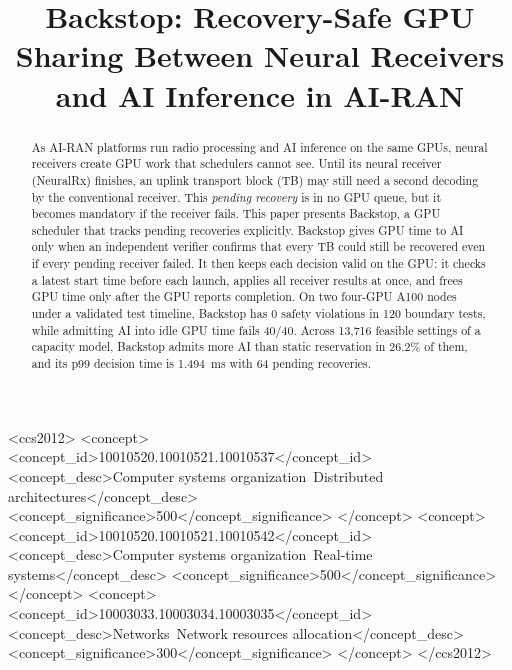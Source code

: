 \documentclass[acmsmall,screen,review,anonymous]{acmart}
\newcommand{\sys}{Backstop\xspace}
\newcommand{\NRx}{NeuralRx\xspace}
\begin{document}
\title[Backstop: Recovery-Safe GPU Sharing in AI-RAN]{Backstop: Recovery-Safe GPU Sharing Between
Neural Receivers and AI Inference in AI-RAN}


\begin{CCSXML}
<ccs2012>
 <concept>
  <concept_id>10010520.10010521.10010537</concept_id>
  <concept_desc>Computer systems organization~Distributed architectures</concept_desc>
  <concept_significance>500</concept_significance>
 </concept>
 <concept>
  <concept_id>10010520.10010521.10010542</concept_id>
  <concept_desc>Computer systems organization~Real-time systems</concept_desc>
  <concept_significance>500</concept_significance>
 </concept>
 <concept>
  <concept_id>10003033.10003034.10003035</concept_id>
  <concept_desc>Networks~Network resources allocation</concept_desc>
  <concept_significance>300</concept_significance>
 </concept>
</ccs2012>
\end{CCSXML}



\begin{abstract}
As AI-RAN platforms run radio processing and AI inference on the same GPUs, neural receivers create
GPU work that schedulers cannot see. Until its neural receiver (\NRx) finishes, an uplink transport
block (TB) may still need a second decoding by the conventional receiver. This \emph{pending recovery}
is in no GPU queue, but it becomes mandatory if the receiver fails. This paper presents \sys, a GPU
scheduler that tracks pending recoveries explicitly. \sys gives GPU time to AI only when an independent
verifier confirms that every TB could still be recovered even if every pending receiver failed. It then
keeps each decision valid on the GPU: it checks a latest start time before each launch, applies all
receiver results at once, and frees GPU time only after the GPU reports completion. On two four-GPU
A100 nodes under a validated test timeline, \sys has 0 safety violations in 120 boundary tests, while
admitting AI into idle GPU time fails 40/40. Across 13,716 feasible settings of a capacity model, \sys
admits more AI than static reservation in 26.2\% of them, and its p99 decision time is 1.494~ms with 64
pending recoveries.
\end{abstract}
\end{document}
